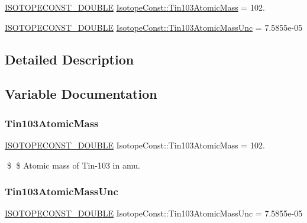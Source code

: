 \begin{DoxyCompactItemize}
\item 
\mbox{\hyperlink{group___isotope_const-_macros_ga8f45a7272ce02c0b4c65c44636ed719a}{I\+S\+O\+T\+O\+P\+E\+C\+O\+N\+S\+T\+\_\+\+D\+O\+U\+B\+LE}} \mbox{\hyperlink{group___isotope_const-_tin-_sn103_ga54d1a810d159ecb695f08b89aabacdee}{Isotope\+Const\+::\+Tin103\+Atomic\+Mass}} = 102.
\item 
\mbox{\hyperlink{group___isotope_const-_macros_ga8f45a7272ce02c0b4c65c44636ed719a}{I\+S\+O\+T\+O\+P\+E\+C\+O\+N\+S\+T\+\_\+\+D\+O\+U\+B\+LE}} \mbox{\hyperlink{group___isotope_const-_tin-_sn103_ga63a71d6b85f38eb23ba08f9a09916d3b}{Isotope\+Const\+::\+Tin103\+Atomic\+Mass\+Unc}} = 7.\+5855e-\/05
\end{DoxyCompactItemize}


\subsection{Detailed Description}


\subsection{Variable Documentation}
\mbox{\label{group___isotope_const-_tin-_sn103_ga54d1a810d159ecb695f08b89aabacdee}} 
\subsubsection{\texorpdfstring{Tin103\+Atomic\+Mass}{Tin103AtomicMass}}
{\footnotesize\ttfamily \mbox{\hyperlink{group___isotope_const-_macros_ga8f45a7272ce02c0b4c65c44636ed719a}{I\+S\+O\+T\+O\+P\+E\+C\+O\+N\+S\+T\+\_\+\+D\+O\+U\+B\+LE}} Isotope\+Const\+::\+Tin103\+Atomic\+Mass = 102.}

\$ \$ Atomic mass of Tin-\/103 in amu. \mbox{\label{group___isotope_const-_tin-_sn103_ga63a71d6b85f38eb23ba08f9a09916d3b}} 
\subsubsection{\texorpdfstring{Tin103\+Atomic\+Mass\+Unc}{Tin103AtomicMassUnc}}
{\footnotesize\ttfamily \mbox{\hyperlink{group___isotope_const-_macros_ga8f45a7272ce02c0b4c65c44636ed719a}{I\+S\+O\+T\+O\+P\+E\+C\+O\+N\+S\+T\+\_\+\+D\+O\+U\+B\+LE}} Isotope\+Const\+::\+Tin103\+Atomic\+Mass\+Unc = 7.\+5855e-\/05}

